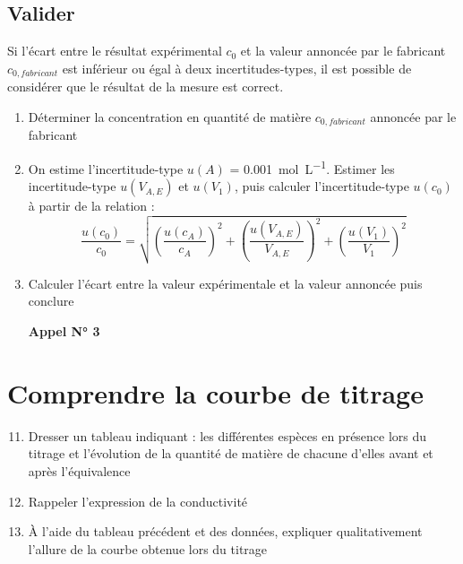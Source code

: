 \documentclass[a4paper,11pt,fleqn]{article}%
\begin{document}
\subsection{Valider}
Si l'écart entre le résultat expérimental $c_0$ et la valeur annoncée par le fabricant $c_{0, fabricant}$ est inférieur ou égal à deux incertitudes-types, il est possible de considérer que le résultat de la mesure est correct.
 \begin{enumerate}[resume]
	\item Déterminer la concentration en quantité de matière $c_{0, fabricant}$ annoncée par le fabricant
	\item On estime l'incertitude-type $u(A)$ = \SI{0,001}{\mole\per\liter}. Estimer les incertitude-type $u(V_{A,E})$ et $u(V_1)$, puis calculer l'incertitude-type $u(c_0)$ à partir de la relation :
	$$\dfrac{u(c_0)}{c_0} = \sqrt{\left(\frac{u(c_A)}{c_A}\right)^2+\left(\frac{u(V_{A,E})}{V_{A,E}}\right)^2+\left(\frac{u(V_1)}{V_1}\right)^2}$$
	\item Calculer l'écart entre la valeur expérimentale et la valeur annoncée puis conclure
	\begin{center}	\textbf{Appel N° 3} \end{center}
\end{enumerate}
\section*{Comprendre la courbe de titrage}
\begin{enumerate}
	\setcounter{enumi}{10}
	\item Dresser un tableau indiquant : les différentes espèces en présence lors du titrage et l'évolution de la quantité de matière de chacune d'elles avant et après l'équivalence
	\item Rappeler l'expression de la conductivité
	\item À l'aide du tableau précédent et des données, expliquer qualitativement l'allure de la courbe obtenue lors du titrage
\end{enumerate}
\end{document}

